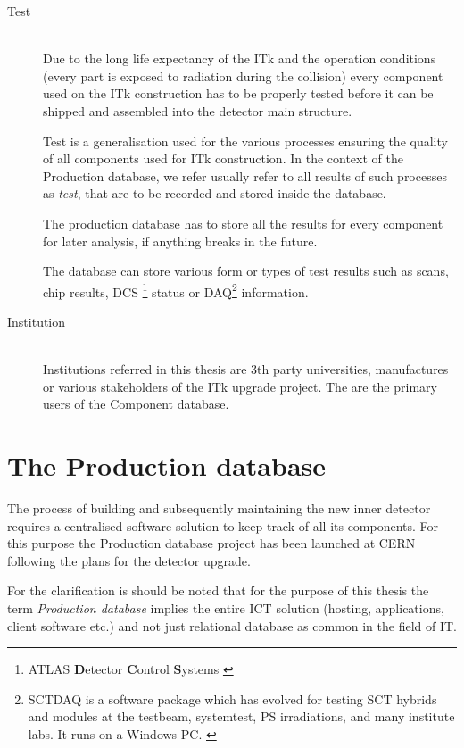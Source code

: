 \begin{description}
	\item[Test] \hfil \\
		Due to the long life expectancy of the ITk and the operation conditions (every part is exposed to radiation during the collision) every component used on the ITk construction has to be properly tested before it can be shipped and assembled into the detector main structure. \cite{vacek}
	

		Test is a generalisation used for the various processes ensuring the quality of all components used for ITk construction. In the context of the Production database, we refer usually refer to all results of such processes as \emph{test}, that are to be recorded and stored inside the database.
		
		The production database has to store all the results for every component for later analysis, if anything breaks in the future.
		
		The database can store various form or types of test results such as scans, chip results, DCS  \footnote{ATLAS \textbf{D}etector \textbf{C}ontrol \textbf{S}ystems \cite{cernDcs}} status or DAQ\footnote{SCTDAQ is a software package which has evolved for testing SCT hybrids and modules at the testbeam, systemtest, PS irradiations, and many institute labs. It runs on a Windows PC. \cite{cernDaq}} information. \cite[p31]{sverma}
		
	\item[Institution] \hfil \\
		Institutions referred in this thesis are 3th party universities, manufactures or various stakeholders of the ITk upgrade project. The are the primary users of the Component database.
\end{description}



\section{The Production database}
\label{sec:theProductionDatabase}
\par The process of building and subsequently maintaining the new inner detector requires a centralised software solution to keep track of all its components. For this purpose the Production database project has been launched at CERN following the plans for the detector upgrade.

\par For the clarification is should be noted that for the purpose of this thesis the term \emph{Production database} implies the entire ICT solution (hosting, applications, client software etc.) and not just relational database as common in the field of IT.

